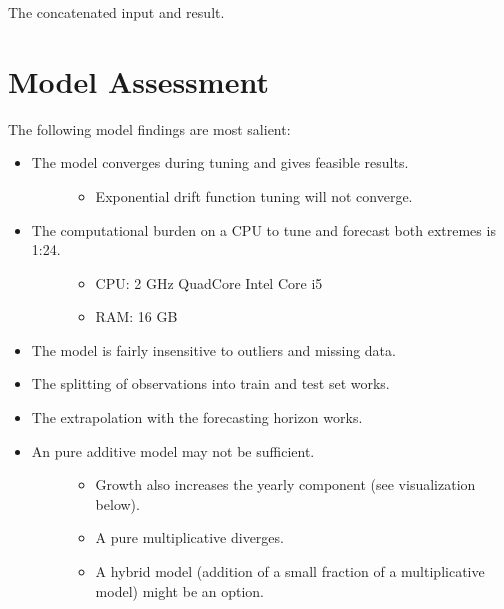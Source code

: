 \documentclass[letterpaper,10pt,english]{sphinxmanual}
\begin{document}
The concatenated input and result.


\section{Model Assessment}
\label{\detokenize{modeling:model-assessment}}
The following model findings are most salient:
\begin{itemize}
\item {} \begin{description}
\item[{The model converges during tuning and gives feasible results.}] \leavevmode\begin{itemize}
\item {} 
Exponential drift function tuning will not converge.

\end{itemize}

\end{description}

\item {} \begin{description}
\item[{The computational burden on a CPU to tune and forecast both extremes is 1:24.}] \leavevmode\begin{itemize}
\item {} 
CPU: 2 GHz Quad\sphinxhyphen{}Core Intel Core i5

\item {} 
RAM: 16 GB

\end{itemize}

\end{description}

\item {} 
The model is fairly insensitive to outliers and missing data.

\item {} 
The splitting of observations into train and test set works.

\item {} 
The extrapolation with the forecasting horizon works.

\item {} \begin{description}
\item[{An pure additive model may not be sufficient.}] \leavevmode\begin{itemize}
\item {} 
Growth also increases the yearly component (see visualization below).

\item {} 
A pure multiplicative diverges.

\item {} 
A hybrid model (addition of a small fraction of a multiplicative model) might be an option.

\end{itemize}

\end{description}

\end{itemize}
\end{document}

